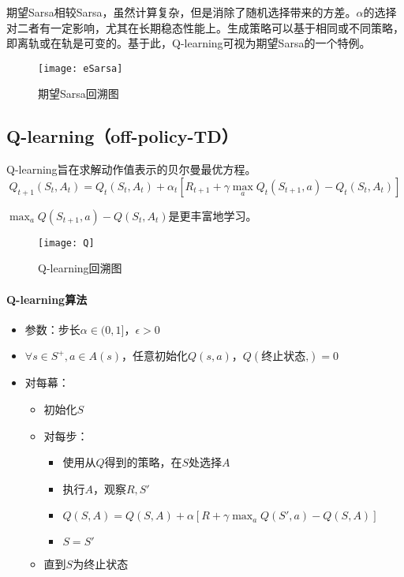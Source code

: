 \documentclass[
12pt, %
a4paper, 
oneside, %
headinclude,footinclude, %
]{scrartcl}
\begin{document}
期望Sarsa相较Sarsa，虽然计算复杂，但是消除了随机选择带来的方差。$ \alpha $的选择对二者有一定影响，尤其在长期稳态性能上。生成策略可以基于相同或不同策略，即离轨或在轨是可变的。基于此，Q-learning可视为期望Sarsa的一个特例。
\begin{figure}[H]
\centering
\texttt{[image: eSarsa]}
\caption[期望Sarsa回溯图]{期望Sarsa回溯图}
\end{figure}
\subsection{Q-learning（off-policy-TD）}
Q-learning旨在求解动作值表示的贝尔曼最优方程。
$$
Q_{t + 1}(S_t, A_t) = Q_t(S_t, A_t) + \alpha_t[R_{t + 1} + \gamma \max_a Q_t(S_{t + 1}, a) - Q_t(S_t, A_t)]
$$

$ \max_a Q(S_{t + 1}, a) - Q(S_t, A_t) $是更丰富地学习。

\begin{figure}[H]
\centering
\texttt{[image: Q]}
\caption[Q-learning回溯图]{Q-learning回溯图}
\end{figure}
\paragraph{Q-learning算法}
\begin{itemize}
\item 参数：步长$ \alpha \in (0,1] $，$ \epsilon > 0 $
\item $ \forall s \in S^+, a \in A(s) $，任意初始化$ Q(s,a) $，$ Q(\text{终止状态,}) = 0 $
\item 对每幕：
\begin{itemize}
\item 初始化$ S $
\item 对每步：
\begin{itemize}
\item 使用从$ Q $得到的策略，在$ S $处选择$ A $
\item 执行$ A $，观察$ R,S' $
\item $ Q(S, A) = Q(S, A) + \alpha [R + \gamma \max_a Q(S', a) - Q(S, A)] $
\item $ S = S' $
\end{itemize}
\item 直到$ S $为终止状态
\end{itemize}
\end{itemize}
\end{document}
